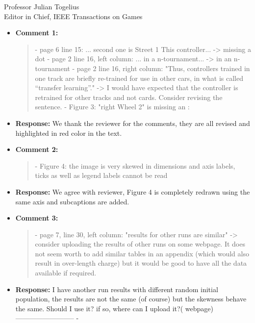 \documentclass[10pt]{letter} %
\begin{document}
\begin{letter}{Professor Julian Togelius \\ Editor in Chief, IEEE Transactions on Games}
\begin{enumerate}
		\begin{itemize}
			\item {\bf Comment 1:}
				\begin{quote}
					- page 6 line 15: ... second one is Street 1 This controller... -> missing a dot
					- page 2 line 16, left column: ... in a n-tournament... -> in an n-tournament
					- page 2 line 16, right column: "Thus, controllers trained in one track are briefly re-trained for use in other cars, in what is called “transfer learning”." -> I would have expected that the controller is retrained for other tracks and not cards. Consider revising the sentence.
					- Figure 3: "right Wheel 2" is missing an :
				\end{quote}	
			\item {\bf Response:} 
					We thank the reviewer for the comments, they are all revised and highlighted in red color in the text.
			\item {\bf Comment 2:}
				\begin{quote}
					- Figure 4: the image is very skewed in dimensions and axis labels, ticks as well as legend labels cannot be read
				\end{quote}	
			\item {\bf Response:} 
				We agree with reviewer, Figure 4 is completely redrawn using the same axis and subcaptions are added. 
			\item {\bf Comment 3:}
				\begin{quote}
					- page 7, line 30, left column: "results for other runs are similar" -> consider uploading the results of other runs on some webpage. It does not seem worth to add similar tables in an appendix (which would also result in over-length charge) but it would be good to have all the data available if required.
				\end{quote}	
			\item {\bf Response:} 
			I have another run results with different random initial population, the results are not the same (of course) but the skewness behave the same. Should I use it?
			if so, where can I upload it?( webpage)
			--------------------------
		-
	   \end{itemize}

\newpage



\end{enumerate}
\end{letter}
\end{document}
